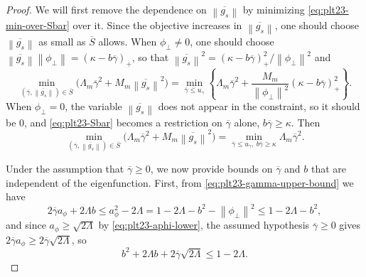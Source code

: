 \documentclass[11pt]{article}
\numberwithin{equation}{section}
\newcommand{\norm}[1]{\left\lVert #1\right\rVert}
\newcommand{\pos}[1]{\left(#1\right)_{+}}
\begin{document}
\begin{proof}
  We will first remove the dependence on $\overline{\norm{g_s}}$ by minimizing \eqref{eq:plt23-min-over-Sbar} over it.
  Since the objective increases in $\overline{\norm{g_s}}$, one should choose $\overline{\norm{g_s}}$ as small as $\overline S$ allows.
  When $\phi_\perp\ne0$, one should choose $\overline{\norm{g_s}}\norm{\phi_\perp}=\pos{\kappa-b\overline\gamma}$, so that $\overline{\norm{g_s}}^2=\pos{\kappa-b\overline\gamma}^2/\norm{\phi_\perp}^2$ and
  \begin{equation}\label{eq:plt23-one-d-t}
    \min_{(\overline\gamma,\overline{\norm{g_s}})\in\overline S}
    \bigl(\Lambda_m\overline\gamma^2+M_m\overline{\norm{g_s}}^2\bigr)
    =\min_{\overline\gamma\le u_\gamma}
    \left\{
    \Lambda_m\overline\gamma^2
    +\frac{M_m}{\norm{\phi_\perp}^2}\pos{\kappa-b\overline\gamma}^2
    \right\}.
  \end{equation}
  When $\phi_\perp=0$, the variable $\overline{\norm{g_s}}$ does not appear in the constraint, so it should be $0$, and \eqref{eq:plt23-Sbar} becomes a restriction on $\overline\gamma$ alone, $b\overline\gamma\ge\kappa$.
  Then
  \begin{equation}\label{eq:plt23-one-d-t-zero}
    \min_{(\overline\gamma,\overline{\norm{g_s}})\in\overline S}
    \bigl(\Lambda_m\overline\gamma^2+M_m\overline{\norm{g_s}}^2\bigr)
    =\min_{\overline\gamma\le u_\gamma,\ b\overline\gamma\ge\kappa}
    \Lambda_m\overline\gamma^2.
  \end{equation}

  Under the assumption that $\overline\gamma\ge0$, we now provide bounds on $\overline\gamma$ and $b$ that are independent of the eigenfunction.
  First, from \eqref{eq:plt23-gamma-upper-bound} we have
  \[
    2\overline\gamma a_\phi+2\Lambda b
    \le a_\phi^2-2\Lambda=1-2\Lambda-b^2-\norm{\phi_\perp}^2
    \le1-2\Lambda-b^2,
  \]
  and since $a_\phi\ge\sqrt{2\Lambda}$ by \eqref{eq:plt23-aphi-lower}, the assumed hypothesis $\overline\gamma\ge0$ gives $2\overline\gamma a_\phi\ge2\overline\gamma\sqrt{2\Lambda}$, so
  \begin{equation}\label{eq:plt23-b-gamma-budget}
    b^2+2\Lambda b+2\overline\gamma\sqrt{2\Lambda}\le1-2\Lambda.
  \end{equation}


\end{proof}
\end{document}
